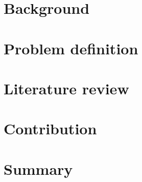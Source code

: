 \documentclass[english,12pt,a4paper,pdftex,sci,utf8]{aaltothesis}
\begin{document}
\thispagestyle{empty}


\clearpage

\section{Background}
\label{sec:background}




\clearpage

\section{Problem definition}
\label{sec:problem-definition}

\clearpage

\section{Literature review}
\label{sec:review}




\clearpage

\section{Contribution}
\label{sec:implementation}




\clearpage

\section{Summary} 
\label{sec:summary}

\clearpage





\end{document}
